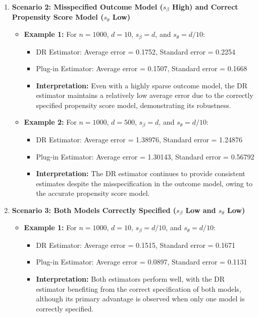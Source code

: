 \documentclass{article}
\begin{document}
\begin{enumerate}
  \item \textbf{Scenario 2: Misspecified Outcome Model (\( s_\beta \) High) and Correct Propensity Score Model (\( s_\theta \) Low)}
    \begin{itemize}
      \item \textbf{Example 1:} For \( n = 1000 \), \( d = 10 \), \( s_\beta = d \), and \( s_\theta = d/10 \):
        \begin{itemize}
          \item DR Estimator: Average error = 0.1752, Standard error = 0.2254
          \item Plug-in Estimator: Average error = 0.1507, Standard error = 0.1668
          \item \textbf{Interpretation:} Even with a highly sparse outcome model, the DR estimator maintains a relatively low average error due to the correctly specified propensity score model, demonstrating its robustness.
        \end{itemize}
      \item \textbf{Example 2:} For \( n = 1000 \), \( d = 500 \), \( s_\beta = d \), and \( s_\theta = d/10 \):
        \begin{itemize}
          \item DR Estimator: Average error = 1.38976, Standard error = 1.24876
          \item Plug-in Estimator: Average error = 1.30143, Standard error = 0.56792
          \item \textbf{Interpretation:} The DR estimator continues to provide consistent estimates despite the misspecification in the outcome model, owing to the accurate propensity score model.
        \end{itemize}
    \end{itemize}

  \item \textbf{Scenario 3: Both Models Correctly Specified (\( s_\beta \) Low and \( s_\theta \) Low)}
    \begin{itemize}
      \item \textbf{Example 1:} For \( n = 1000 \), \( d = 10 \), \( s_\beta = d/10 \), and \( s_\theta = d/10 \):
        \begin{itemize}
          \item DR Estimator: Average error = 0.1515, Standard error = 0.1671
          \item Plug-in Estimator: Average error = 0.0897, Standard error = 0.1131
          \item \textbf{Interpretation:} Both estimators perform well, with the DR estimator benefiting from the correct specification of both models, although its primary advantage is observed when only one model is correctly specified.
        \end{itemize}
    \end{itemize}


\end{enumerate}
\end{document}
